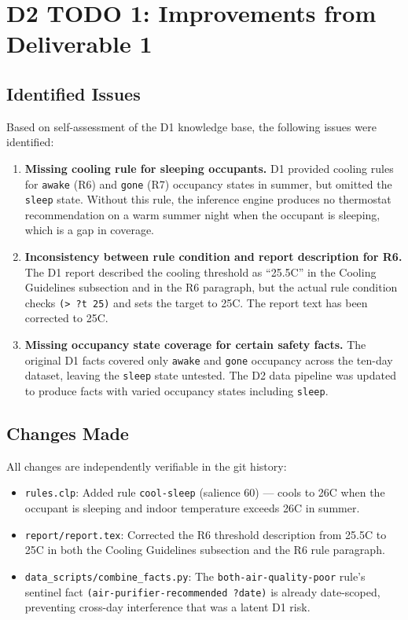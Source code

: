 \documentclass{article}
\begin{document}
\section{D2 TODO 1: Improvements from Deliverable 1}

\subsection{Identified Issues}

Based on self-assessment of the D1 knowledge base, the following issues were identified:

\begin{enumerate}
    \item \textbf{Missing cooling rule for sleeping occupants.}
    D1 provided cooling rules for \texttt{awake} (R6) and \texttt{gone} (R7) occupancy states in summer, but omitted the \texttt{sleep} state. Without this rule, the inference engine produces no thermostat recommendation on a warm summer night when the occupant is sleeping, which is a gap in coverage.

    \item \textbf{Inconsistency between rule condition and report description for R6.}
    The D1 report described the cooling threshold as ``25.5\textdegree C'' in the Cooling Guidelines subsection and in the R6 paragraph, but the actual rule condition checks \texttt{(> ?t 25)} and sets the target to 25\textdegree C. The report text has been corrected to 25\textdegree C.

    \item \textbf{Missing occupancy state coverage for certain safety facts.}
    The original D1 facts covered only \texttt{awake} and \texttt{gone} occupancy across the ten-day dataset, leaving the \texttt{sleep} state untested. The D2 data pipeline was updated to produce facts with varied occupancy states including \texttt{sleep}.
\end{enumerate}

\subsection{Changes Made}

All changes are independently verifiable in the git history:

\begin{itemize}
    \item \texttt{rules.clp}: Added rule \texttt{cool-sleep} (salience 60) — cools to 26\textdegree C when the occupant is sleeping and indoor temperature exceeds 26\textdegree C in summer.
    \item \texttt{report/report.tex}: Corrected the R6 threshold description from 25.5\textdegree C to 25\textdegree C in both the Cooling Guidelines subsection and the R6 rule paragraph.
    \item \texttt{data\_scripts/combine\_facts.py}: The \texttt{both-air-quality-poor} rule's sentinel fact \texttt{(air-purifier-recommended ?date)} is already date-scoped, preventing cross-day interference that was a latent D1 risk.
\end{itemize}
\end{document}
